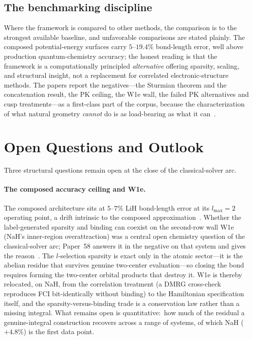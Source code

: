 \documentclass[aps,pra,twocolumn,superscriptaddress,longbibliography]{revtex4-2}
\begin{document}
\subsection{The benchmarking discipline}

Where the framework is compared to other methods, the comparison is to
the strongest available baseline, and unfavorable comparisons are stated
plainly.  The composed potential-energy surfaces carry $5$--$19.4\%$
bond-length error, well above production quantum-chemistry accuracy; the
honest reading is that the framework is a computationally principled
\emph{alternative} offering sparsity, scaling, and structural insight,
not a replacement for correlated electronic-structure methods.  The
papers report the negatives---the Sturmian theorem and the concatenation
result, the PK ceiling, the W1e wall, the failed PK alternatives and
cusp treatments---as a first-class part of the corpus, because the
characterization of what natural geometry \emph{cannot} do is as
load-bearing as what it can~\cite{loutey_paper8, loutey_fci_mol,
loutey_paper17}.

\section{Open Questions and Outlook}
\label{sec:open}

Three structural questions remain open at the close of the
classical-solver arc.

\paragraph{The composed accuracy ceiling and W1e.}  The composed
architecture sits at $5$--$7\%$ LiH bond-length error at its
$l_{\max}=2$ operating point, a drift intrinsic to the composed
approximation~\cite{loutey_paper17}.  Whether the label-generated
sparsity and binding can coexist on the second-row wall W1e (NaH's
inner-region overattraction) was a
central open chemistry question of the classical-solver arc; Paper~58
answers it in the negative on that system and gives the reason~\cite{loutey_paper58}.
The $l$-selection sparsity is exact only in the atomic sector---it is the
abelian residue that survives genuine two-center evaluation---so closing
the bond requires forming the two-center orbital products that destroy
it.  W1e is thereby relocated, on NaH, from the correlation treatment (a DMRG
cross-check reproduces FCI bit-identically without binding) to the
Hamiltonian specification itself, and the sparsity-versus-binding trade
is a conservation law rather than a missing integral.  What remains open
is quantitative:\ how much of the residual a genuine-integral
construction recovers across a range of systems, of which NaH ($+4.8\%$)
is the first data point.
\end{document}
